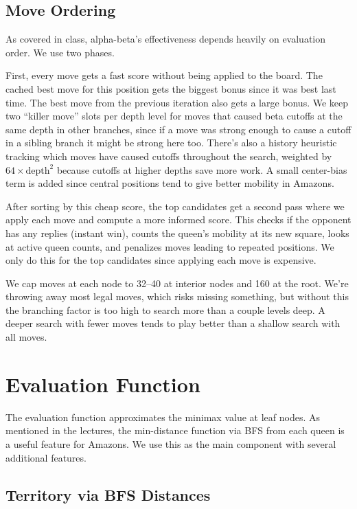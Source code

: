 \documentclass[12pt, letterpaper]{article}
\begin{document}
\subsection{Move Ordering}

As covered in class, alpha-beta's effectiveness depends heavily on evaluation order. We use two phases.

First, every move gets a fast score without being applied to the board. The cached best move for this position gets the biggest bonus since it was best last time. The best move from the previous iteration also gets a large bonus. We keep two ``killer move'' slots per depth level for moves that caused beta cutoffs at the same depth in other branches, since if a move was strong enough to cause a cutoff in a sibling branch it might be strong here too. There's also a history heuristic tracking which moves have caused cutoffs throughout the search, weighted by $64 \times \text{depth}^2$ because cutoffs at higher depths save more work. A small center-bias term is added since central positions tend to give better mobility in Amazons.

After sorting by this cheap score, the top candidates get a second pass where we apply each move and compute a more informed score. This checks if the opponent has any replies (instant win), counts the queen's mobility at its new square, looks at active queen counts, and penalizes moves leading to repeated positions. We only do this for the top candidates since applying each move is expensive.

We cap moves at each node to 32--40 at interior nodes and 160 at the root. We're throwing away most legal moves, which risks missing something, but without this the branching factor is too high to search more than a couple levels deep. A deeper search with fewer moves tends to play better than a shallow search with all moves.


\section{Evaluation Function}

The evaluation function approximates the minimax value at leaf nodes. As mentioned in the lectures, the min-distance function via BFS from each queen is a useful feature for Amazons. We use this as the main component with several additional features.

\subsection{Territory via BFS Distances}
\end{document}

